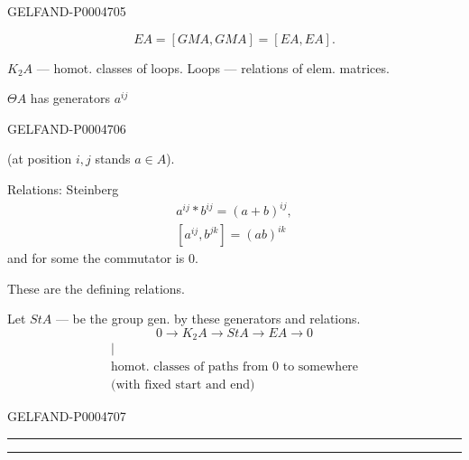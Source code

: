 \begin{GelfandAdjacentEvidence}{GELFAND-P000470}{5}

\[
EA=[GMA,GMA]=[EA,EA].
\]

$K_2A$ — homot. classes of loops. Loops — relations of elem. matrices.

$\Theta A$ has generators $a^{ij}$
\end{GelfandAdjacentEvidence}
\begin{GelfandAdjacentEvidence}{GELFAND-P000470}{6}

(at position $i,j$ stands $a\in A$).

Relations: Steinberg
\[
\begin{gathered}
a^{ij}\ast b^{ij}=(a+b)^{ij},\\
[a^{ij},b^{jk}]=(ab)^{ik}
\end{gathered}
\]
and for some the commutator is $0$.

These are the defining relations.

Let $StA$ — be the group gen. by these generators and relations.
\[
0\longrightarrow K_2A\longrightarrow StA\longrightarrow EA\longrightarrow0
\]
\[
\begin{gathered}
\vert\\[-.2ex]
\text{homot. classes of paths from }0\text{ to somewhere}\\
\text{(with fixed start and end)}
\end{gathered}
\]
\end{GelfandAdjacentEvidence}
\begin{GelfandAdjacentEvidence}{GELFAND-P000470}{7}


{\centering\rule{3.1em}{.4pt}\quad\textperiodcentered\quad\rule{4em}{.4pt}\par}
\end{GelfandAdjacentEvidence}

